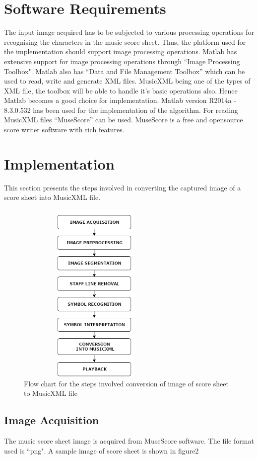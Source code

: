 \documentclass[journal]{IEEEtran}
\begin{document}
\section{Software Requirements}
 The input image acquired has to be subjected to various processing operations for recognising the characters in the music score sheet. Thus, the platform used for the implementation  should support
image processing operations. Matlab has extensive support for image processing operations through “Image Processing Toolbox". Matlab also has “Data and File Management Toolbox” which can be used to read, write and generate XML files. MusicXML being one of the types of XML file, the toolbox will be able to handle it's basic operations also. Hence Matlab becomes a good choice for implementation. Matlab version R2014a - 8.3.0.532 has been used for the implementation of the algorithm. For reading MusicXML files “MuseScore” can be used. MuseScore is a free and opensource score writer software with rich features.

\section{Implementation}
This section presents the steps involved in converting the captured image of a score sheet into MusicXML file.


{
\begin{figure}
\includegraphics[width=3in,height=3.5in,clip,keepaspectratio]{resources/flowchart/flowchart}
\centering
\caption{Flow chart for the steps involved conversion of image of score sheet to MusicXML file}
\end{figure}
}

\subsection{Image Acquisition}
 The music score sheet image is acquired from MuseScore software. The file format used is ``png". A sample image of score sheet is shown in figure2 
 
\end{document}
